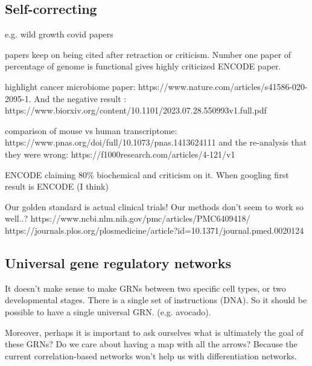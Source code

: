 
\subsection{Self-correcting}

e.g. wild growth covid papers

papers keep on being cited after retraction or criticism. Number one paper of percentage of genome is functional gives highly criticized ENCODE paper.

highlight cancer microbiome paper: https://www.nature.com/articles/s41586-020-2095-1. And the negative result : https://www.biorxiv.org/content/10.1101/2023.07.28.550993v1.full.pdf

comparison of mouse vs human transcriptome: https://www.pnas.org/doi/full/10.1073/pnas.1413624111 and the re-analysis that they were wrong: https://f1000research.com/articles/4-121/v1

ENCODE claiming 80\% biochemical and criticism on it. When googling first result is ENCODE (I think)

Our golden standard is actual clinical trials! Our methods don't seem to work so well..?
https://www.ncbi.nlm.nih.gov/pmc/articles/PMC6409418/
https://journals.plos.org/plosmedicine/article?id=10.1371/journal.pmed.0020124


\subsection{Universal gene regulatory networks}

It doesn't make sense to make GRNs between two specific cell types, or two developmental stages. There is a single set of instructions (DNA). So it should be possible to have a single universal GRN. (e.g. avocado).

Moreover, perhaps it is important to ask ourselves what is ultimately the goal of these GRNs? Do we care about having a map with all the arrows? Because the current correlation-based networks won't help us with differentiation networks. 